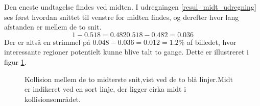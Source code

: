 {Den eneste undtagelse findes ved midten. I udregningen
\ref{resul_midt_udregning} ses først hvordan snittet til venstre for
midten findes, og derefter hvor lang afstanden er mellem de to snit.
\begin{equation}\label{resul_midt_udregningen}
    1-0.518 = 0.482
    0.518-0.482 = 0.036
\end{equation}
Der er altså en strimmel på $0.048-0.036 = 0.012 = 1.2\%$ af
billedet, hvor interessante regioner potentielt kunne blive talt to gange.
Dette er illustreret i figur \ref{resultat_fejl_midt}.
\begin{figure}[!h]
	\centering
	\caption{Kollision mellem de to midterste snit,vist ved de to
	blå linjer.Midt er indikeret ved en sort linje, der ligger cirka
	midt i kollisionsområdet.}
	\label{resultat_fejl_midt}
\end{figure}

}
